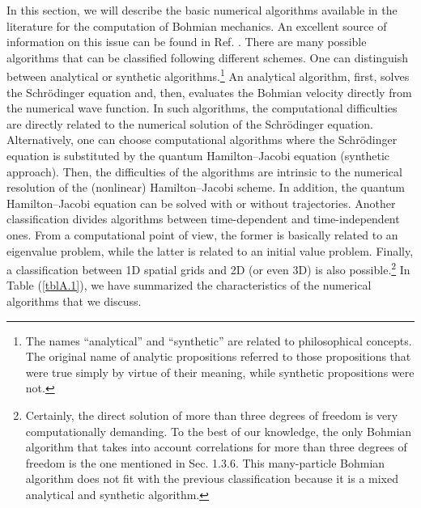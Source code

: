 \documentclass[nofootinbib, secnumarabic, amsmath, nobibnotes,11pt,aps,pra, floatfix]{revtex4-1}
\newcommand{\tref}[1]{Table (\ref{#1})}
\begin{document}
In this section, we will describe the basic numerical algorithms
available in the literature for the computation of Bohmian
mechanics. An excellent source of information on this issue can be
found in Ref. \cite{om.wyatt2005}. There are many possible
algorithms that can be classified following different schemes.
One can distinguish between analytical or synthetic algorithms.\footnote{The names ``analytical'' and ``synthetic'' are related to philosophical concepts. The original name of analytic propositions referred to those propositions that were true simply by virtue of their meaning, while synthetic propositions were not.}
An analytical algorithm, first, solves the Schr\"odinger equation and, then, evaluates the Bohmian velocity directly from the numerical wave function. In such algorithms, the computational difficulties are directly related to the numerical solution of the Schr\"odinger equation. Alternatively, one can choose computational algorithms where the Schr\"odinger equation is substituted by the quantum Hamilton--Jacobi equation (synthetic approach). Then, the difficulties of the algorithms are intrinsic to the numerical resolution of the (nonlinear) Hamilton--Jacobi scheme. In addition,
the quantum Hamilton--Jacobi equation can be solved with or without trajectories. Another classification divides
algorithms between time-dependent and time-independent ones. From a computational point of view, the
former is basically related to an eigenvalue problem, while the latter is related to an initial
value problem. Finally, a classification between 1D spatial grids and 2D (or even 3D)
is also possible.\footnote{Certainly, the direct solution of more than three degrees of freedom is very computationally demanding. To the best of our knowledge, the only Bohmian algorithm that takes into account correlations for more than three degrees of freedom is the one mentioned in Sec. 1.3.6.     
This many-particle Bohmian algorithm does not fit with the previous
classification because it is a mixed analytical and synthetic
algorithm.} In \tref{tblA.1}, we have summarized the characteristics
of the numerical algorithms that we discuss.
\end{document}
